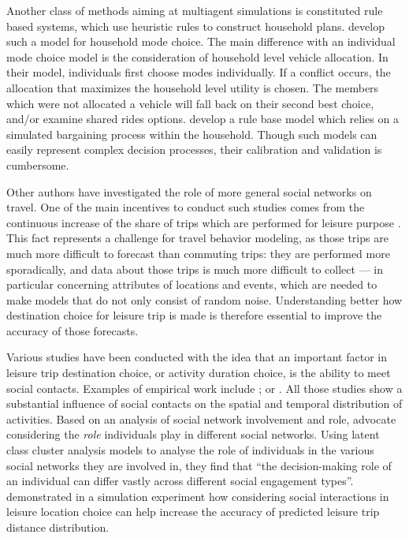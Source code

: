 {Another class of methods aiming at multiagent simulations
is constituted rule based systems,
which use heuristic rules to construct household plans.
%
 develop such a model for household mode choice.
The main difference with an individual mode choice model is the consideration of household level vehicle allocation.
In their model, individuals first choose modes individually.
If a conflict occurs, the allocation that maximizes the household level utility is chosen.
The members which were not allocated a vehicle will fall back on their second best choice,
and/or examine shared rides options.
%
develop a rule base model which
relies on a simulated bargaining process within the household.
Though such models can easily represent complex decision processes,
their calibration and validation is cumbersome.

Other authors have investigated the role of more general social networks on travel.
One of the main incentives to conduct such studies comes from the continuous increase of the share of
trips which are performed for leisure purpose \cite{SchlichEtAl_TransportRev_2004,Axhausen_DonaghyEtAl_2005}.
This fact represents a challenge for travel behavior modeling,
as those trips are much more difficult to forecast than commuting trips:
they are performed more sporadically, and data about those trips is much more difficult to collect
--- in particular concerning attributes of locations and events,
which are needed to make models that do not only consist of random noise.
Understanding better how destination choice for leisure trip is made is therefore essential to improve
the accuracy of those forecasts.

Various studies have been conducted with the idea that an important factor in leisure trip destination
choice, or activity duration choice, is the ability to meet social contacts.
Examples of empirical work include ;  or .
All those studies show a substantial influence of social contacts on the spatial and temporal
distribution of activities.
%
Based on an analysis of social network involvement and role, 
advocate considering the \emph{role} individuals play in different social networks.
Using latent class cluster analysis models to analyse the role of individuals in
the various social networks they are involved in,
they find that ``the decision-making role of an individual can differ vastly across different
social engagement types''.
%
 demonstrated in a simulation experiment how considering social interactions
in leisure location choice can help increase the accuracy of predicted leisure trip distance distribution.

}
